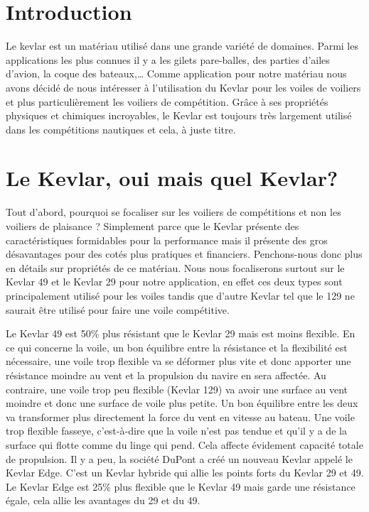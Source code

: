 
\begin{multicols}{2}
\section{Introduction}
   Le kevlar est un matériau utilisé dans une grande variété de domaines.  Parmi les applications les plus connues il y a les gilets pare-balles, des parties d’ailes d’avion, la coque des bateaux,…  Comme application pour notre matériau nous avons décidé de nous intéresser à l’utilisation du Kevlar pour les voiles de voiliers et plus particulièrement les voiliers de compétition.  Grâce à ses propriétés physiques et chimiques incroyables, le Kevlar est toujours très largement utilisé dans les compétitions nautiques et cela, à juste titre.

\section{Le Kevlar, oui mais quel Kevlar?}
Tout d’abord, pourquoi se focaliser sur les voiliers de compétitions et non les voiliers de plaisance ?  Simplement parce que le Kevlar présente des caractéristiques formidables pour la performance mais il présente des gros désavantages pour des cotés plus pratiques et financiers.  Penchons-nous donc plus en détails sur propriétés de ce matériau.  Nous nous focaliserons surtout sur le Kevlar 49 et le Kevlar 29 pour notre application, en effet ces deux types sont principalement utilisé pour les voiles tandis que d’autre Kevlar tel que le 129 ne saurait être utilisé pour faire une voile compétitive.

Le Kevlar 49 est 50\% plus résistant que le Kevlar 29 mais est moins flexible.  En ce qui concerne la voile, un bon équilibre entre la résistance et la flexibilité est nécessaire, une voile trop flexible va se déformer plus vite et donc apporter une résistance moindre au vent et la propulsion du navire en sera affectée.  Au contraire, une voile trop peu flexible (Kevlar 129) va avoir une surface au vent moindre et donc une surface de voile plus petite.  Un bon équilibre entre les deux  va transformer plus directement la force du vent en vitesse au bateau.   Une voile trop flexible fasseye, c’est-à-dire que la voile n’est pas tendue et qu’il y a de la surface qui flotte comme du linge qui pend.  Cela affecte évidement capacité totale de propulsion.  Il y a peu, la société DuPont a créé un nouveau Kevlar appelé le Kevlar Edge.  C’est un Kevlar hybride qui allie les points forts du Kevlar 29 et 49.  Le Kevlar Edge est 25\% plus flexible que le Kevlar 49 mais garde une résistance égale,  cela allie les avantages du 29 et du 49. 


\end{multicols}
